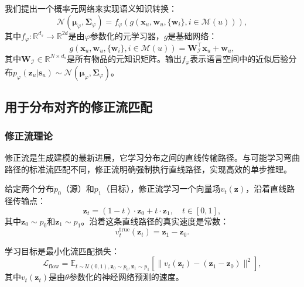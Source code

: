 \documentclass[sigconf]{acmart}
\begin{document}
我们提出一个概率元网络来实现语义知识转换：
\begin{equation}
\label{language_p}
\mathcal N(\boldsymbol{\mu}_{\varphi}, \boldsymbol{\Sigma}_{\varphi}) = f_\varphi \left (g(\mathbf x_u, \mathbf w_u, \{\mathbf w_i\}, i \in \mathcal M(u))\right ),
\end{equation}
其中$f_\varphi: \mathbb{R}^{d_s} \to \mathbb{R}^{2d}$是由$\varphi$参数化的元学习器，$g$是基础网络：
\begin{equation}
\label{meta_network}
g(\mathbf x_u, \mathbf w_u, \{\mathbf w_i\}, i \in \mathcal M(u))=\mathbf W_{\mathcal I}^\top \mathbf x_u + \mathbf w_u,
\end{equation}
其中$\mathbf W_{\mathcal I} \in \mathbb R^{N \times d_s}$是所有物品的元知识矩阵。输出$f_{\varphi}$表示语言空间中的近似后验分布$p_{\varphi}(\mathbf z_u|\mathbf s_u) \sim \mathcal N(\boldsymbol{\mu}_{\varphi}, \boldsymbol{\Sigma}_{\varphi})$。

\subsection{用于分布对齐的修正流匹配}
\subsubsection{\textbf{修正流理论}}
修正流\cite{lipman2023rectified}是生成建模的最新进展，它学习分布之间的直线传输路径。与可能学习弯曲路径的标准流匹配\cite{liu2022flow}不同，修正流明确强制执行直线路径，实现高效的单步推理。

给定两个分布$p_0$（源）和$p_1$（目标），修正流学习一个向量场$v_t(\mathbf z)$，沿着直线路径传输点：
\begin{equation}
\label{straight_path}
\mathbf z_t = (1-t) \cdot \mathbf z_0 + t \cdot \mathbf z_1, \quad t \in [0, 1],
\end{equation}
其中$\mathbf z_0 \sim p_0$和$\mathbf z_1 \sim p_1$。沿着这条直线路径的真实速度是常数：
\begin{equation}
\label{true_velocity}
v_t^{\text{true}}(\mathbf z_t) = \mathbf z_1 - \mathbf z_0.
\end{equation}

学习目标是最小化流匹配损失：
\begin{equation}
\label{flow_loss}
\mathcal L_{\text{flow}} = \mathbb E_{t \sim \mathcal U(0,1), \mathbf z_0 \sim p_0, \mathbf z_1 \sim p_1} \left[ \|v_t(\mathbf z_t) - (\mathbf z_1 - \mathbf z_0)\|^2 \right],
\end{equation}
其中$v_t(\mathbf z_t)$是由$\theta$参数化的神经网络预测的速度。
\end{document}
